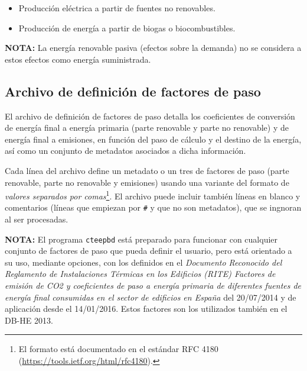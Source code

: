 \documentclass[10pt,notitlepage,oneside,a4paper]{article}
\begin{document}
\begin{myquote}
\begin{itemize}
              \begin{itemize}
                  \item Producción eléctrica a partir de fuentes no renovables.
                  \item Producción de energía a partir de biogas o biocombustibles.
              \end{itemize}
    \end{itemize}

    \textbf{NOTA:} La energía renovable pasiva (efectos sobre la demanda) no se considera a estos efectos como energía suministrada.
\end{myquote}


\clearpage
\newpage
\subsection{Archivo de definición de factores de paso}\label{sec:formatofactorespaso}

El archivo de definición de factores de paso detalla los coeficientes de conversión de energía final a energía primaria (parte renovable  y parte no renovable) y de energía final a emisiones, en función del paso de cálculo y el destino de la energía, así como un conjunto de metadatos asociados a dicha información.

Cada línea del archivo define un metadato o un tres de factores de paso (parte renovable, parte no renovable y emisiones) usando una variante del formato de \textit{valores separados por comas}\footnote{El formato está documentado en el estándar RFC 4180 (\url{https://tools.ietf.org/html/rfc4180}).}. El archivo puede incluir también líneas en blanco y comentarios (líneas que empiezan por \texttt{\#} y que no son metadatos), que se ingnoran al ser procesadas.

\begin{myquote}\small
    \textbf{NOTA:} El programa \texttt{cteepbd} está preparado para funcionar con cualquier conjunto de factores de paso que pueda definir el usuario, pero está orientado a su uso, mediante opciones, con los definidos en el \textit{Documento Reconocido del Reglamento de Instalaciones Térmicas en los Edificios (RITE) Factores de emisión de CO2 y coeficientes de paso a energía primaria de diferentes fuentes de energía final consumidas en el sector de edificios en España} del 20/07/2014 y de aplicación desde el 14/01/2016. Estos factores son los utilizados también en el DB-HE 2013.
\end{myquote}
\end{document}

